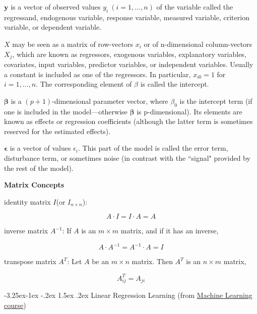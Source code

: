\documentclass{article}
\makeatletter
\renewcommand\paragraph{\@startsection{paragraph}{4}{\z@}%
                                     {-3.25ex\@plus -1ex \@minus -.2ex}%
                                     {1.5ex \@plus .2ex}%
                                     {\normalfont\normalsize\bfseries}}
\makeatother
\begin{document}
\noindent \(\textbf{y}\) is a vector of observed values \(y_{i}\ (i=1,\ldots ,n)\) of the variable called the regressand, endogenous variable, response variable, measured variable, criterion variable, or dependent variable.

\bigskip

\noindent \(X\) may be seen as a matrix of row-vectors \(x_{i}\) or of n-dimensional column-vectors \(X_{j}\), which are known as regressors, exogenous variables, explanatory variables, covariates, input variables, predictor variables, or independent variables. Usually a constant is included as one of the regressors. In particular, \(x_{i0} = 1\) for \(i = 1, \dots, n\). The corresponding element of \(\beta\) is called the intercept. 

\bigskip

\noindent \(\boldsymbol{\beta}\) is a \((p + 1)\)-dimensional parameter vector, where \(\beta_{0}\) is the intercept term (if one is included in the model—otherwise \(\boldsymbol{\beta}\) is p-dimensional). Its elements are known as effects or regression coefficients (although the latter term is sometimes reserved for the estimated effects).

\bigskip

\noindent \(\boldsymbol{\epsilon}\) is a vector of values \(\epsilon_{i}\). This part of the model is called the error term, disturbance term, or sometimes noise (in contrast with the ``signal" provided by the rest of the model).

\bigskip

\noindent \textbf{Matrix Concepts}

\bigskip

\noindent identity matrix \(I\)(or \(I_{n \times n}\)):

\[A \cdot I = I \cdot A = A\]

\noindent inverse matrix \(A^{-1}\): If \(A\) is an \(m \times m\) matrix, and if it has an inverse,

\[A \cdot A^{-1} = A^{-1} \cdot A = I\]

\noindent transpose matrix \(A^{T}\): Let \(A\) be an \(m \times n\) matrix. Then \(A^T\) is an \(n \times m\) matrix,

\[A^T_{ij} = A_{ji}\]

\paragraph{Linear Regression Learning (from \href{https://www.coursera.org/learn/machine-learning}{Machine Learning course})}
\end{document}
